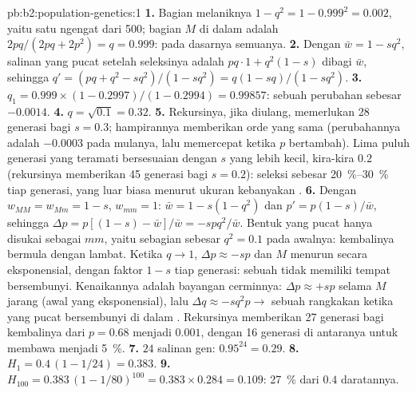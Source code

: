 \begin{solution}{pb:b2:population-genetics:1}
\textbf{1.} Bagian melaniknya $1 - q^{2} = 1 - 0.999^{2} = 0.002$,
yaitu satu ngengat dari 500; bagian  $M$ di dalam 
adalah $2pq/(2pq + 2p^{2}) = q = 0.999$: pada dasarnya semuanya.
\textbf{2.} Dengan $\bar w = 1 - sq^{2}$, salinan  yang pucat
setelah seleksinya adalah $pq\cdot 1 + q^{2}(1 - s)$ dibagi $\bar w$, sehingga $q'
= (pq + q^{2} - sq^{2})/(1 - sq^{2}) = q(1 - sq)/(1 - sq^{2})$.
\textbf{3.} $q_1 = 0.999\times(1 - 0.2997)/(1 - 0.2994) = 0.99857$:
sebuah perubahan sebesar $-0.0014$.
\textbf{4.} $q = \sqrt{0.1} = 0.32$.
\textbf{5.} Rekursinya, jika diulang, memerlukan 28 generasi bagi $s =
0.3$; hampirannya memberikan orde yang sama (perubahannya adalah
$-0.0003$ pada mulanya, lalu memercepat ketika $p$ bertambah). Lima
puluh generasi yang teramati bersesuaian dengan $s$ yang lebih kecil,
kira-kira $0.2$ (rekursinya memberikan 45 generasi bagi $s = 0.2$):
seleksi sebesar \qtyrange{20}{30}{\%} tiap generasi, yang luar biasa
menurut ukuran kebanyakan .
\textbf{6.} Dengan $w_{MM} = w_{Mm} = 1 - s$, $w_{mm} = 1$: $\bar w = 1
- s(1 - q^{2})$ dan $p' = p(1 - s)/\bar w$, sehingga $\Delta p = p[(1 - s) -
\bar w]/\bar w = -spq^{2}/\bar w$. Bentuk yang pucat hanya disukai
sebagai  $mm$, yaitu sebagian sebesar $q^{2} = 0.1$ pada
awalnya: kembalinya bermula dengan lambat. Ketika $q \to 1$, $\Delta p \approx -sp$ dan $M$ menurun secara eksponensial, dengan faktor $1 - s$
tiap generasi: sebuah   tidak memiliki tempat bersembunyi.
Kenaikannya adalah bayangan cerminnya: $\Delta p \approx +sp$ selama
$M$ jarang (awal yang eksponensial), lalu $\Delta q \approx -sq^{2}p \to$ sebuah rangkakan ketika  yang pucat bersembunyi di dalam
. Rekursinya memberikan 27 generasi bagi kembalinya dari $p = 0.68$ menjadi $0.001$, dengan 16 generasi di antaranya untuk membawa
 menjadi \qty{5}{\%}.
\textbf{7.} $24$ salinan gen: $0.95^{24} = 0.29$.
\textbf{8.} $H_1 = 0.4\,(1 - 1/24) = 0.383$.
\textbf{9.} $H_{100} = 0.383\,(1 - 1/80)^{100} = 0.383\times 0.284 =
0.109$: \qty{27}{\%} dari $0.4$ daratannya.

\end{solution}
